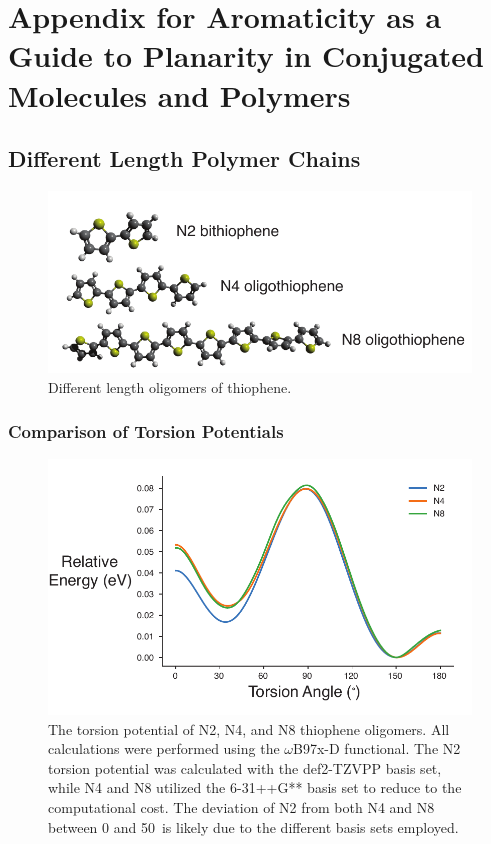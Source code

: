\chapter{Appendix for Aromaticity as a Guide to Planarity in Conjugated Molecules and Polymers}

\section{Different Length Polymer Chains}\label{sec:aroma_diff_len_poly}
\begin{figure}[hbt!]
    \centering
    \includegraphics{figures/append_aroma/p_chains_graphic_copy.pdf}
    \caption[Different Length Thiophene Oligomers]{Different length oligomers of thiophene.}
    \label{fig:p_chains}
\end{figure}

\subsection{Comparison of Torsion Potentials}
\begin{figure}[hbt!]
    \centering
    \includegraphics{figures/append_aroma/p_tor_compare_copy.pdf}
    \caption[Torsion Potential of Different Length Thiophene Oligomers]{The torsion potential of N2, N4, and N8 thiophene oligomers. All calculations were performed using the $\omega$B97x-D functional. The N2 torsion potential was calculated with the def2-TZVPP basis set, while N4 and N8 utilized the 6-31++G** \cite{Hehre1972} basis set to reduce to the computational cost. The deviation of N2 from both N4 and N8 between 0 and 50\textdegree \ is likely due to the different basis sets employed.}
    \label{fig:p_tor_compare}
\end{figure}

